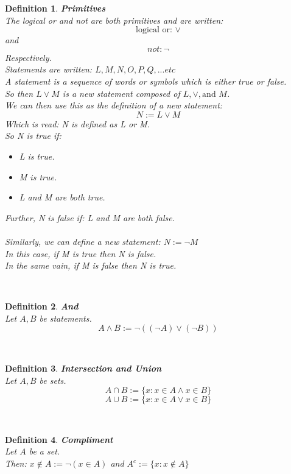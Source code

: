 \documentclass[12pt]{extarticle}
\theoremstyle{plain}
\theoremstyle{plain}
\theoremstyle{plain}
\theoremstyle{Definition}
\newtheorem{def.}{Definition}[section]
\theoremstyle{Definition}
\theoremstyle{plain}
\newcommand{\cut}[0]{\noindent\framebox[\linewidth]{\rule{\linewidth}{2pt}}\\}
\begin{document}
\begin{def.} \textbf{Primitives} \\
	The logical or and not are both primitives and are written: \\ 
	$$\text{logical or: }\lor$$ 
	and 
	$$not: \lnot$$
	Respectively. \\
	Statements are written: $L,M,N,O,P,Q,... etc$ \\
	A statement is a sequence of words or symbols which is either true or false. \\
	So then $L \lor M$ is a new statement composed of $L,\lor,\text{and } M$. \\
	We can then use this as the definition of a new statement: \\ 
	$$N := L \lor M$$
	Which is read: N is defined as L or M. \\
	So N is true if: 
	\begin{itemize}
		\item 	L is true. 
		\item M is true.
		\item L and M are both true. 
	\end{itemize}
	Further, N is false if: 
	L and M are both false. \\ \\
	Similarly, we can define a new statement: $N := \lnot M$ \\ 
	In this case, if M is true then N is false. \\
	In the same vain, if M is false then N is true. 
\end{def.}
\cut
\begin{def.} \textbf{And} \\
	Let $A,B$ be statements. \\ 
	$$A \land B := \lnot((\lnot A) \lor (\lnot B))$$ 
\end{def.}
\cut
\begin{def.} \textbf{Intersection and Union} \\
	Let $A,B$ be sets. \\ 
	$$A \cap B := \{ x : x \in A \land x \in B\}$$
	$$A \cup B := \{ x : x \in A \lor x \in B\}$$
\end{def.}
\cut
\begin{def.} \textbf{Compliment} \\ 
	Let $A$ be a set.  \\
	Then: $x \not \in A := \lnot(x \in A)$ and 
	$A^c := \{x : x \not \in A\}$
\end{def.}
\cut
\end{document}
